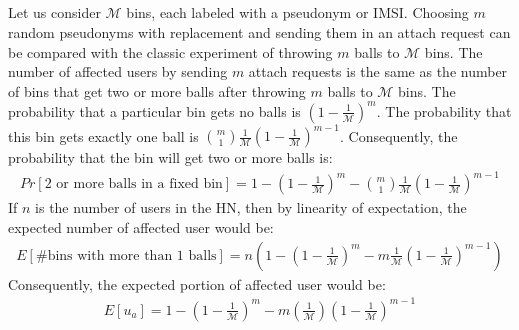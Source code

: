 \documentclass{llncs} %
\begin{document}
\begin{subappendices}
\renewcommand{\thesection}{\Alph{section}}%

\section{} \label{appendix:A}
Let us consider $\mathcal{M}$ bins, each labeled with a pseudonym or IMSI. Choosing $m$ random pseudonyms with replacement and sending them in an attach request can be compared with the classic experiment of throwing $m$ balls to $\mathcal{M}$ bins. The number of affected users by sending $m$ attach requests is the same as the number of bins that get two or more balls after throwing $m$ balls to $\mathcal{M}$ bins. The probability that a particular bin gets no balls is $\left(1-\frac{1}{\mathcal{M}}\right)^m$. The probability that this bin gets exactly one ball is $\binom{m}{1}\frac{1}{\mathcal{M}}\left(1-\frac{1}{\mathcal{M}}\right)^{m-1}$. Consequently, the probability that the bin will get two or more balls is:
\begin{eqnarray*}
 Pr[\text{2 or more balls in a fixed bin}] = 1 - \left(1-\frac{1}{\mathcal{M}}\right)^m - \binom{m}{1}\frac{1}{\mathcal{M}}\left(1-\frac{1}{\mathcal{M}}\right)^{m-1}
\end{eqnarray*}
If $n$ is the number of users in the HN, then by linearity of expectation, the expected number of affected user would be:
\begin{eqnarray*}
E[\# \text{bins with more than 1 balls}] = n\left(1 - \left(1-\frac{1}{\mathcal{M}}\right)^m - m\frac{1}{\mathcal{M}}\left(1-\frac{1}{\mathcal{M}}\right)^{m-1}\right)
\end{eqnarray*}
Consequently, the expected portion of affected user would be:
\begin{eqnarray*}
 E[u_a] = 1 - \left(1-\frac{1}{\mathcal{M}}\right)^m - m\left(\frac{1}{\mathcal{M}}\right)\left(1-\frac{1}{\mathcal{M}}\right)^{m-1}
\end{eqnarray*}



\end{subappendices}
\end{document}
